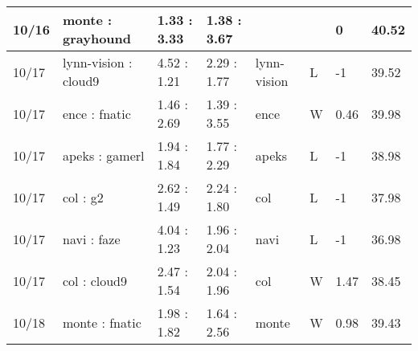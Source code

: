\begin{small}
\begin{longtable}{|l|l|l|l|l|l|l|l|}
	10/16                               & monte : grayhound                   & 1.33 : 3.33                             & 1.38 : 3.67                             &                                   &                                   & 0                                    & 40.52                             \\ \hline
	10/17                               & lynn-vision : cloud9                & 4.52 : 1.21                             & 2.29 : 1.77                             & lynn-vision                       & L                                 & -1                                   & 39.52                             \\ \hline
	10/17                               & ence : fnatic                       & 1.46 : 2.69                             & 1.39 : 3.55                             & ence                              & W                                 & 0.46                                 & 39.98                             \\ \hline
	10/17                               & apeks : gamerl                      & 1.94 : 1.84                             & 1.77 : 2.29                             & apeks                             & L                                 & -1                                   & 38.98                             \\ \hline
	10/17                               & col : g2                            & 2.62 : 1.49                             & 2.24 : 1.80                             & col                               & L                                 & -1                                   & 37.98                             \\ \hline
	10/17                               & navi : faze                         & 4.04 : 1.23                             & 1.96 : 2.04                             & navi                              & L                                 & -1                                   & 36.98                             \\ \hline
	10/17                               & col : cloud9                        & 2.47 : 1.54                             & 2.04 : 1.96                             & col                               & W                                 & 1.47                                 & 38.45                             \\ \hline
	10/18                               & monte : fnatic                      & 1.98 : 1.82                             & 1.64 : 2.56                             & monte                             & W                                 & 0.98                                 & 39.43                             \\ \hline

\end{longtable}
\end{small}
